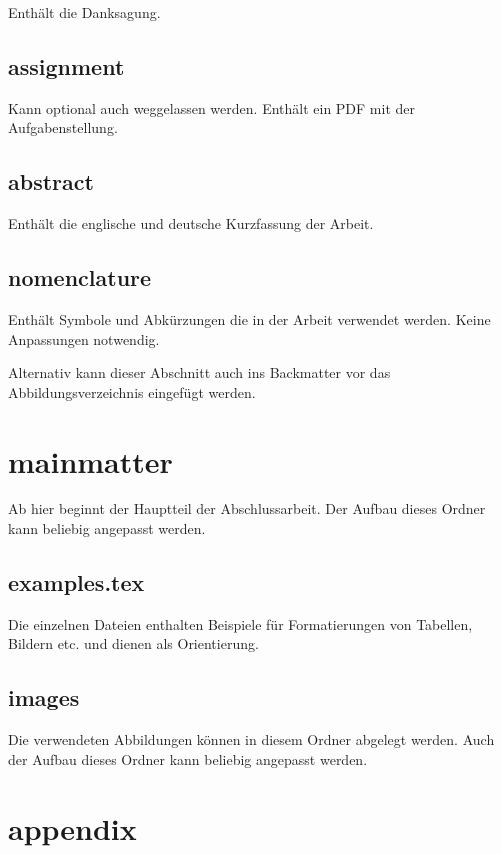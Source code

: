 Enthält die Danksagung. 

\subsection*{assignment}

Kann optional auch weggelassen werden. Enthält ein PDF mit der Aufgabenstellung.

\subsection*{abstract}

Enthält die englische und deutsche Kurzfassung der Arbeit.

\subsection*{nomenclature}

Enthält Symbole und Abkürzungen die in der Arbeit verwendet werden. Keine Anpassungen notwendig.

Alternativ kann dieser Abschnitt auch ins Backmatter vor das Abbildungsverzeichnis eingefügt werden.

\section*{mainmatter}
\label{section:_A_mainmatter}

Ab hier beginnt der Hauptteil der Abschlussarbeit. Der Aufbau dieses Ordner kann beliebig angepasst werden.

\subsection*{examples.tex}

Die einzelnen Dateien enthalten Beispiele für Formatierungen von Tabellen, Bildern etc. und dienen als Orientierung.

\subsection*{images}

Die verwendeten Abbildungen können in diesem Ordner abgelegt werden. Auch der Aufbau dieses Ordner kann beliebig angepasst werden.

\section*{appendix}

